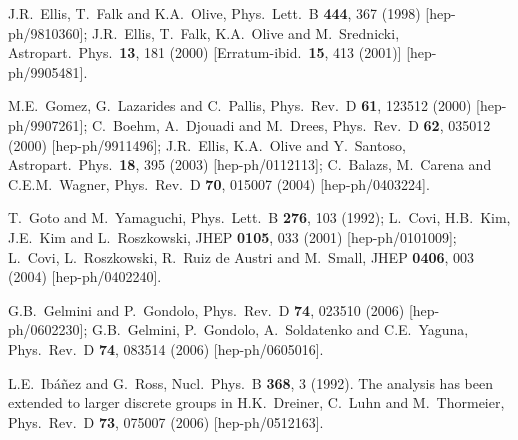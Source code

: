 \documentclass[12pt]{article}
\begin{document}
\begin{thebibliography}{999}
J.R.~Ellis, T.~Falk and K.A.~Olive,
  Phys.\ Lett.\ B {\bf 444}, 367 (1998)
  [hep-ph/9810360];
J.R.~Ellis, T.~Falk, K.A.~Olive and M.~Srednicki,
  Astropart.\ Phys.\  {\bf 13}, 181 (2000)
  [Erratum-ibid.\  {\bf 15}, 413 (2001)]
  [hep-ph/9905481].

M.E.~Gomez, G.~Lazarides and C.~Pallis,
  Phys.\ Rev.\ D {\bf 61}, 123512 (2000)
  [hep-ph/9907261];
C.~Boehm, A.~Djouadi and M.~Drees,
  Phys.\ Rev.\ D {\bf 62}, 035012 (2000)
  [hep-ph/9911496];
J.R.~Ellis, K.A.~Olive and Y.~Santoso,
  Astropart.\ Phys.\  {\bf 18}, 395 (2003)
  [hep-ph/0112113];
C.~Balazs, M.~Carena and C.E.M.~Wagner,
  Phys.\ Rev.\ D {\bf 70}, 015007 (2004)
  [hep-ph/0403224].

T.~Goto and M.~Yamaguchi,
  Phys.\ Lett.\ B {\bf 276}, 103 (1992);
L.~Covi, H.B.~Kim, J.E.~Kim and L.~Roszkowski,
  JHEP {\bf 0105}, 033 (2001)
  [hep-ph/0101009];
L.~Covi, L.~Roszkowski, R.~Ruiz de Austri and M.~Small,
  JHEP {\bf 0406}, 003 (2004)
  [hep-ph/0402240].

G.B.~Gelmini and P.~Gondolo,
  Phys.\ Rev.\  D {\bf 74}, 023510 (2006)
  [hep-ph/0602230];
G.B.~Gelmini, P.~Gondolo, A.~Soldatenko and C.E.~Yaguna,
  Phys.\ Rev.\  D {\bf 74}, 083514 (2006)
  [hep-ph/0605016].

L.E.~Ib\'a\~nez and G.~Ross,
  Nucl.\ Phys.\ B {\bf 368}, 3 (1992).
The analysis has been extended to larger discrete groups in
H.K.~Dreiner, C.~Luhn and M.~Thormeier,
  Phys.\ Rev.\ D {\bf 73}, 075007 (2006)
  [hep-ph/0512163].  


\end{thebibliography}
\end{document}
